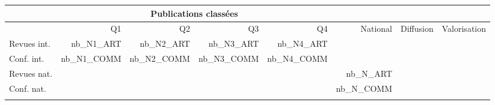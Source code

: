 

\begin{tabular}{p{2.5cm}|r|r|r|r|r|r|r} 
     & \multicolumn{4}{c|}{Publications classées} &   &   \\ \hline
     & Q1 & Q2 & Q3 & Q4  & National & Diffusion & Valorisation\\
    \hline
    Revues int. & {{nb_N1_ART}}  & {{nb_N2_ART}}  & {{nb_N3_ART}}  & {{nb_N4_ART}}  & & & \\
   Conf. int. & {{nb_N1_COMM}} & {{nb_N2_COMM}} & {{nb_N3_COMM}} & {{nb_N4_COMM}} & & &\\ \hline
    \hline
    Revues nat. &  &  &  &  & {{nb_N_ART}} & & \\
   Conf. nat. &  &  &  &  & {{nb_N_COMM}} & &\\ \hline
    \hline
     {%
      {%
     {%
    {%
   {%
    \hline
\end{tabular}

